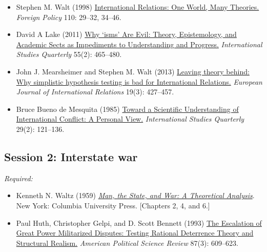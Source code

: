 \documentclass[12pt, a4paper]{article}
\begin{document}
\begin{itemize}
  \item Stephen M. Walt (1998) \href{https://doi.org/10.2307/1149275}{International Relations: One World, Many Theories.} \textit{Foreign Policy} 110: 29--32, 34--46.
  \item David A Lake (2011) \href{https://doi.org/10.1111/j.1468-2478.2011.00661.x}{Why `isms' Are Evil: Theory, Epistemology, and Academic Sects as Impediments to Understanding and Progress.} \textit{International Studies Quarterly} 55(2): 465--480.
  \item John J. Mearsheimer and Stephen M. Walt (2013) \href{https://doi.org/10.1177/1354066113494320}{Leaving theory behind: Why simplistic hypothesis testing is bad for International Relations.} \textit{European Journal of International Relations} 19(3): 427--457.
  \item Bruce Bueno de Mesquita (1985) \href{https://doi.org/10.2307/2600500}{Toward a Scientific Understanding of International Conflict: A Personal View.} \textit{International Studies Quarterly} 29(2): 121--136.
\end{itemize}


\vspace{20pt}
\hline
\subsection*{Session 2: Interstate war}

\noindent\textit{Required:}

\begin{itemize}
  \item Kenneth N. Waltz (1959) \href{https://cup.columbia.edu/book/man-the-state-and-war/9780231188043}{\textit{Man, the State, and War: A Theoretical Analysis}}. New York: Columbia University Press. [Chapters 2, 4, and 6.]
  \item Paul Huth, Christopher Gelpi, and D. Scott Bennett (1993) \href{https://doi.org/10.2307/2938739}{The Escalation of Great Power Militarized Disputes: Testing Rational Deterrence Theory and Structural Realism.} \textit{American Political Science Review} 87(3): 609--623.
\end{itemize}
\end{document}

